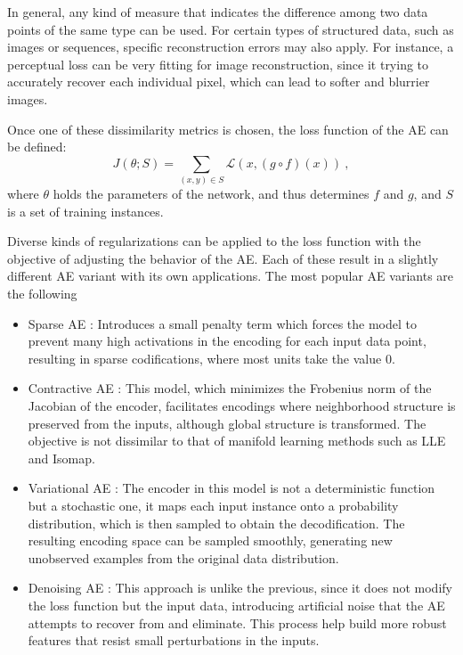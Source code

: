 In general, any kind of measure that indicates the difference among two data points of the same type can be used. For certain types of structured data, such as images or sequences, specific reconstruction errors may also apply. For instance, a perceptual loss  can be very fitting for image reconstruction, since it  trying to accurately recover each individual pixel, which can lead to softer and blurrier images.

Once one of these dissimilarity metrics is chosen, the loss function of the AE can be defined:
\begin{equation}
  J(\theta;S)=\sum_{(x,y)\in S} \mathcal L(x, (g\circ f)(x))~,
\end{equation}
where $\theta$ holds the parameters of the network, and thus determines $f$ and $g$, and $S$ is a set of training instances.

Diverse kinds of regularizations can be applied to the loss function with the objective of adjusting the behavior of the AE. Each of these result in a slightly different AE variant with its own applications. \iffalse The most popular AE variants are the following

  \begin{itemize}
    \item Sparse AE : Introduces a small penalty term which forces the model to prevent many high activations in the encoding for each input data point, resulting in sparse codifications, where most units take the value 0.
    \item Contractive AE : This model, which minimizes the Frobenius norm of the Jacobian of the encoder, facilitates encodings where neighborhood structure is preserved from the inputs, although global structure is transformed. The objective is not dissimilar to that of manifold learning methods such as LLE and Isomap.
    \item Variational AE : The encoder in this model is not a deterministic function but a stochastic one, it maps each input instance onto a probability distribution, which is then sampled to obtain the decodification. The resulting encoding space can be sampled smoothly, generating new unobserved examples from the original data distribution.
    \item Denoising AE : This approach is unlike the previous, since it does not modify the loss function but the input data, introducing artificial noise that the AE attempts to recover from and eliminate. This process help build more robust features that resist small perturbations in the inputs.
  \end{itemize}

